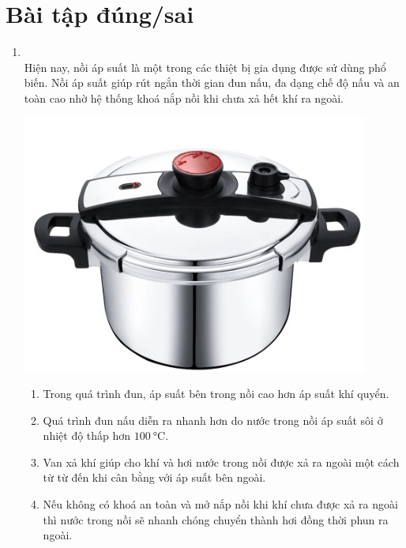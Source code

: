 \section{Bài tập đúng/sai}
\begin{enumerate}[label=\bfseries Câu \arabic*:, leftmargin=1.7cm]
	\item {}\\
	Hiện nay, nồi áp suất là một trong các thiệt bị gia dụng được sử dùng phổ biến. Nồi áp suất giúp rút ngắn thời gian đun nấu, đa dạng chế độ nấu và an toàn cao nhờ hệ thống khoá nắp nồi khi chưa xả hết khí ra ngoài.
	\begin{center}
		\includegraphics[width=0.\linewidth]{../figs/VN12-Y24-PH-SYL-011P-5}
	\end{center}
\begin{enumerate}[label=\alph*)]
	\item Trong quá trình đun, áp suất bên trong nồi cao hơn áp suất khí quyển.
	\item Quá trình đun nấu diễn ra nhanh hơn do nước trong nồi áp suất sôi ở nhiệt độ thấp hơn $\SI{100}{\celsius}$.
	\item Van xả khí giúp cho khí và hơi nước trong nồi được xả ra ngoài một cách từ từ đến khi cân bằng với áp suất bên ngoài.
	\item Nếu không có khoá an toàn và mở nắp nồi khi khí chưa được xả ra ngoài thì nước trong nồi sẽ nhanh chóng chuyển thành hơi đồng thời phun ra ngoài.
\end{enumerate}
\end{enumerate}

